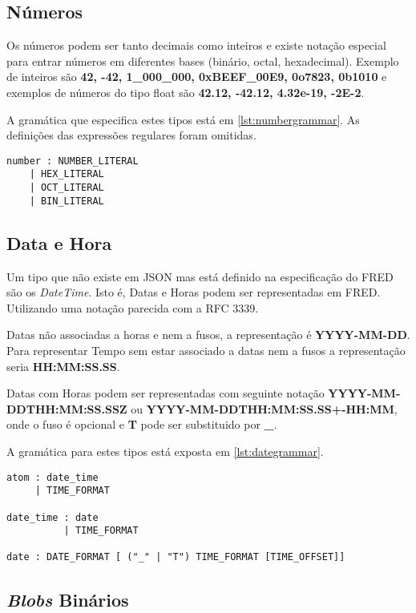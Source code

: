 \subsection{Números}

Os números podem ser tanto decimais como inteiros e existe notação especial para
entrar números em diferentes bases (binário, octal, hexadecimal). Exemplo de inteiros 
são \textbf{42, -42, 1\_000\_000, 0xBEEF\_00E9, 0o7823, 0b1010} e exemplos de números do tipo
float são \textbf{42.12, -42.12, 4.32e-19, -2E-2}.

A gramática que especifica estes tipos está em \ref{lst:numbergrammar}. As definições das
expressões regulares foram omitidas.

\begin{lstlisting}[caption=Gramática para números,label={lst:numbergrammar}]
number : NUMBER_LITERAL 
    | HEX_LITERAL
    | OCT_LITERAL
    | BIN_LITERAL 
\end{lstlisting}    

\subsection{Data e Hora}

Um tipo que não existe em JSON mas está definido na especificação do FRED são os \textit{DateTime}.
Isto é, Datas e Horas podem ser representadas em FRED. Utilizando uma notação parecida com
a RFC 3339.

Datas não associadas a horas e nem a fusos, a representação é \textbf{YYYY-MM-DD}.
Para representar Tempo sem estar associado a datas nem a fusos a representação seria \textbf{HH:MM:SS.SS}.

Datas com Horas podem ser representadas com seguinte notação \textbf{YYYY-MM-DDTHH:MM:SS.SSZ} ou
\textbf{YYYY-MM-DDTHH:MM:SS.SS+-HH:MM}, onde o fuso é opcional e \textbf{T} pode ser 
substituido por \textbf{\_}.

A gramática para estes tipos está exposta em \ref{lst:dategrammar}.

\begin{lstlisting}[caption=Gramática para datas e horas,label={lst:dategrammar}]
atom : date_time 
     | TIME_FORMAT

date_time : date
          | TIME_FORMAT

date : DATE_FORMAT [ ("_" | "T") TIME_FORMAT [TIME_OFFSET]]
\end{lstlisting}  

\subsection{\textit{Blobs} Binários}


